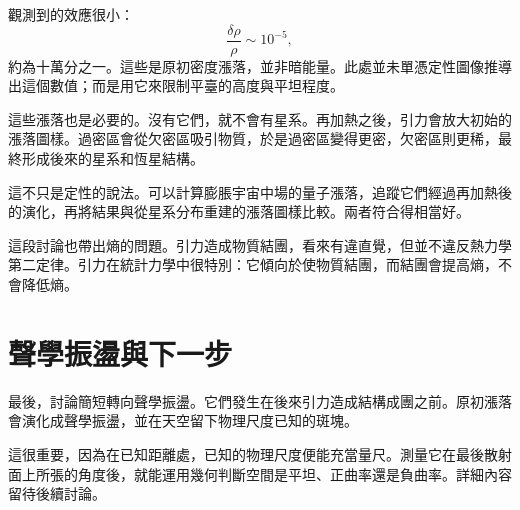 觀測到的效應很小：
\begin{equation}
\frac{\delta\rho}{\rho}\sim 10^{-5},
\end{equation}
約為十萬分之一。這些是原初密度漲落，並非暗能量。此處並未單憑定性圖像推導出這個數值；而是用它來限制平臺的高度與平坦程度。

這些漲落也是必要的。沒有它們，就不會有星系。再加熱之後，引力會放大初始的漲落圖樣。過密區會從欠密區吸引物質，於是過密區變得更密，欠密區則更稀，最終形成後來的星系和恆星結構。

這不只是定性的說法。可以計算膨脹宇宙中場的量子漲落，追蹤它們經過再加熱後的演化，再將結果與從星系分布重建的漲落圖樣比較。兩者符合得相當好。

這段討論也帶出熵的問題。引力造成物質結團，看來有違直覺，但並不違反熱力學第二定律。引力在統計力學中很特別：它傾向於使物質結團，而結團會提高熵，不會降低熵。

\begin{classroomqa}
\end{classroomqa}

\section{聲學振盪與下一步}

最後，討論簡短轉向聲學振盪。它們發生在後來引力造成結構成團之前。原初漲落會演化成聲學振盪，並在天空留下物理尺度已知的斑塊。

這很重要，因為在已知距離處，已知的物理尺度便能充當量尺。測量它在最後散射面上所張的角度後，就能運用幾何判斷空間是平坦、正曲率還是負曲率。詳細內容留待後續討論。

\begin{classroomqa}
\end{classroomqa}